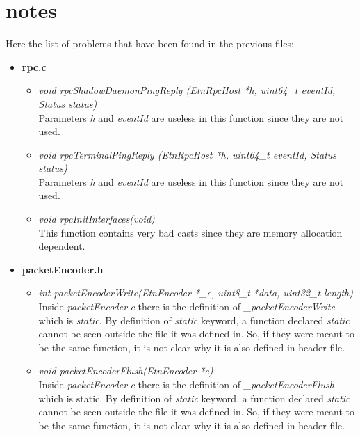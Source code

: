 \section{notes}
Here the list of problems that have been found in the previous files:
\begin{itemize}

\item \textbf{rpc.c}
\begin{itemize}
\item \emph{void rpcShadowDaemonPingReply (EtnRpcHost *h, uint64\_t eventId, Status status)}\\
Parameters \emph{h} and \emph{eventId} are useless in this function since they are not used.

\item \emph{void rpcTerminalPingReply (EtnRpcHost *h, uint64\_t eventId, Status status)}\\
Parameters \emph{h} and \emph{eventId} are useless in this function since they are not used.

\item \emph{void rpcInitInterfaces(void)}\\
This function contains very bad casts since they are memory allocation dependent.
\end{itemize}

\item \textbf{packetEncoder.h}
\begin{itemize}
\item\emph{int packetEncoderWrite(EtnEncoder *\_e, uint8\_t *data, uint32\_t length)}\\
Inside \emph{packetEncoder.c} there is the definition of \emph{\_packetEncoderWrite} which is \emph{static}. By definition of \emph{static} keyword, a function declared \emph{static} cannot be seen outside the file it was defined in. So, if they were meant to be the same function, it is not clear why it is also defined in header file.

\item\emph{void packetEncoderFlush(EtnEncoder *e)}\\
Inside \emph{packetEncoder.c} there is the definition of \emph{\_packetEncoderFlush} which is static. By definition of \emph{static} keyword, a function declared \emph{static} cannot be seen outside the file it was defined in. So, if they were meant to be the same function, it is not clear why it is also defined in header file.
\end{itemize}


\end{itemize}
